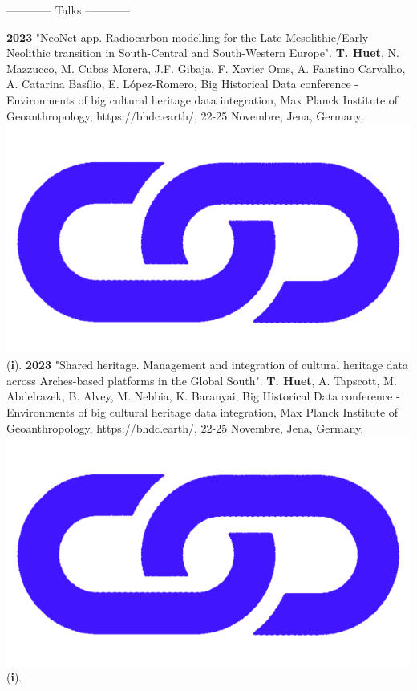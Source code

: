 \documentclass{article}
\newcommand{\fr}[1]{} %
\newcommand{\en}[1]{#1}   %
\begin{document}
\begin{center}
\fr{------------ Communications ------------}
\en{------------ Talks ------------}
\end{center}
\smallbreak
\textbf{2023 }"NeoNet app. Radiocarbon modelling for the Late Mesolithic/Early Neolithic transition in South-Central and South-Western Europe". \textbf{T. Huet}, N. Mazzucco, M. Cubas Morera, J.F. Gibaja, F. Xavier Oms, A. Faustino Carvalho, A. Catarina Basílio, E. López-Romero, Big Historical Data conference - Environments of big cultural heritage data integration, Max Planck Institute of Geoanthropology, https://bhdc.earth/, 22-25 Novembre, Jena, Germany,  \href{https://zoometh.github.io/neonet/doc/talks/2023-bhdc}{\includegraphics[scale=0.02]{link_darkblue.png}} (\textbf{i}).
\smallbreak
\textbf{2023 }"Shared heritage. Management and integration of cultural heritage data across Arches-based platforms in the Global South". \textbf{T. Huet}, A. Tapscott, M. Abdelrazek, B. Alvey, M. Nebbia, K. Baranyai, Big Historical Data conference - Environments of big cultural heritage data integration, Max Planck Institute of Geoanthropology, https://bhdc.earth/, 22-25 Novembre, Jena, Germany,  \href{https://colab.research.google.com/github/achp-project/cultural-heritage/blob/main/presentation/bhdc/rm_compar.ipynb}{\includegraphics[scale=0.02]{link_darkblue.png}} (\textbf{i}).
\end{document}
